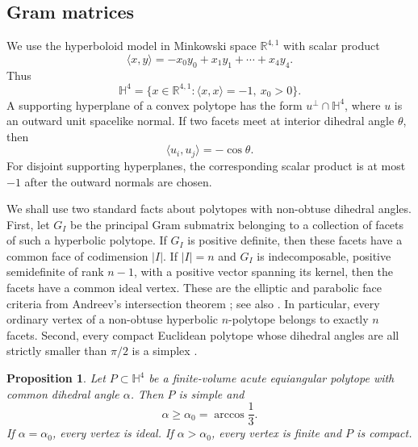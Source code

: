 \documentclass[12pt,a4paper]{article}
\theoremstyle{thmstyleone}
\newtheorem{proposition}[theorem]{Proposition}
\theoremstyle{thmstylethree}
\theoremstyle{thmstyletwo}
\newcommand{\HH}{\mathbb H}
\newcommand{\RR}{\mathbb R}
\begin{document}
\subsection{Gram matrices}

We use the hyperboloid model in Minkowski space $\RR^{4,1}$ with scalar
product
\[
 \langle x,y\rangle=-x_0y_0+x_1y_1+\cdots+x_4y_4.
\]
Thus
\[
 \HH^4=\{x\in\RR^{4,1}:\langle x,x\rangle=-1,\ x_0>0\}.
\]
A supporting hyperplane of a convex polytope has the form
$u^\perp\cap\HH^4$, where $u$ is an outward unit spacelike normal.  If two
facets meet at interior dihedral angle $\theta$, then
\begin{equation}\label{eq:dihedral-Gram}
 \langle u_i,u_j\rangle=-\cos\theta.
\end{equation}
For disjoint supporting hyperplanes, the corresponding scalar product is at
most $-1$ after the outward normals are chosen.

We shall use two standard facts about polytopes with non-obtuse dihedral
angles.  First, let $G_I$ be the principal Gram submatrix belonging to a
collection of facets of such a hyperbolic polytope.  If $G_I$ is positive
definite, then these facets have a common face of codimension $|I|$.  If
$|I|=n$ and $G_I$ is indecomposable, positive semidefinite of rank $n-1$,
with a positive vector spanning its kernel, then the facets have a common
ideal vertex.  These are the elliptic and parabolic face criteria from
Andreev's intersection theorem \cite{Andreev1970Intersection}; see also
\cite[Part I, Chapter 6, Sections 2--3]{Vinberg1993}.  In particular, every
ordinary vertex of a non-obtuse hyperbolic $n$-polytope belongs to exactly
$n$ facets.  Second, every compact Euclidean polytope whose dihedral angles
are all strictly smaller than $\pi/2$ is a simplex \cite{Coxeter1934}.

\begin{proposition}\label{prop:simple-angle-range}
Let $P\subset\HH^4$ be a finite-volume acute equiangular polytope
with common dihedral angle $\alpha$.  Then $P$ is simple and
\[
 \alpha\geq\alpha_0=\arccos\frac13.
\]
If $\alpha=\alpha_0$, every vertex is ideal.  If
$\alpha>\alpha_0$, every vertex is finite and $P$ is compact.
\end{proposition}
\end{document}
